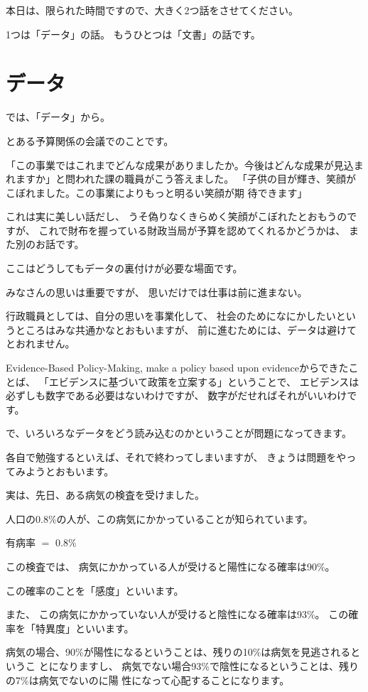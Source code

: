 \documentclass[uplatex,jis2004,dvipdfmx,12pt]{jsarticle}
\begin{document}
本日は、限られた時間ですので、大きく2つ話をさせてください。

1つは「データ」の話。
もうひとつは「文書」の話です。


\section{データ}
では、「データ」から。

とある予算関係の会議でのことです。

「この事業ではこれまでどんな成果がありましたか。今後はどんな成果が見込ま
れますか」と問われた課の職員がこう答えました。
「子供の目が輝き、笑顔がこぼれました。この事業によりもっと明るい笑顔が期
待できます」

これは実に美しい話だし、
うそ偽りなくきらめく笑顔がこぼれたとおもうのですが、
これで財布を握っている財政当局が予算を認めてくれるかどうかは、
また別のお話です。

ここはどうしてもデータの裏付けが必要な場面です。

みなさんの思いは重要ですが、
思いだけでは仕事は前に進まない。

行政職員としては、自分の思いを事業化して、
社会のためになにかしたいというところはみな共通かなとおもいますが、
前に進むためには、データは避けてとおれません。

Evidence-Based Policy-Making,
make a policy based upon evidenceからできたことば、
「エビデンスに基づいて政策を立案する」ということで、
エビデンスは必ずしも数字である必要はないわけですが、
数字がだせればそれがいいわけです。

で、いろいろなデータをどう読み込むのかということが問題になってきます。

各自で勉強するといえば、それで終わってしまいますが、
きょうは問題をやってみようとおもいます。

実は、先日、ある病気の検査を受けました。

人口の0.8\%の人が、この病気にかかっていることが知られています。

有病率 $=$ 0.8\%



この検査では、
病気にかかっている人が受けると陽性になる確率は90\%。

この確率のことを「感度」といいます。

また、
この病気にかかっていない人が受けると陰性になる確率は93\%。
この確率を「特異度」といいます。

病気の場合、90\%が陽性になるということは、残りの10\%は病気を見逃されるというこ
とになりますし、
病気でない場合93\%で陰性になるということは、残りの7\%は病気でないのに陽
性になって心配することになります。
\end{document}
